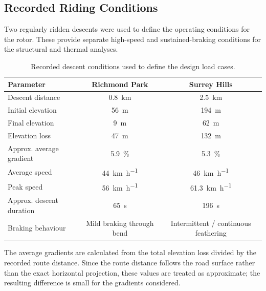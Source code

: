 \documentclass[11pt,a4paper]{article}
\begin{document}
\subsection{Recorded Riding Conditions}

Two regularly ridden descents were used to define the operating conditions for
the rotor. These provide separate high-speed and sustained-braking conditions
for the structural and thermal analyses.

\begin{table}[H]
    \centering
    \caption{Recorded descent conditions used to define the design load cases.}
    \label{tab:rides}
    \begin{tabularx}{\textwidth}{l c c}
        \toprule
        Parameter & Richmond Park & Surrey Hills \\
        \midrule

        Descent distance
        & \SI{0.8}{km}
        & \SI{2.5}{km} \\

        Initial elevation
        & \SI{56}{m}
        & \SI{194}{m} \\

        Final elevation
        & \SI{9}{m}
        & \SI{62}{m} \\

        Elevation loss
        & \SI{47}{m}
        & \SI{132}{m} \\

        Approx. average gradient
        & \SI{5.9}{\percent}
        & \SI{5.3}{\percent} \\

        Average speed
        & \SI{44}{km.h^{-1}}
        & \SI{46}{km.h^{-1}} \\

        Peak speed
        & \SI{56}{km.h^{-1}}
        & \SI{61.3}{km.h^{-1}} \\

        Approx. descent duration
        & \SI{65}{s}
        & \SI{196}{s} \\

        Braking behaviour
        & Mild braking through bend
        & Intermittent / continuous feathering \\

        \bottomrule
    \end{tabularx}
\end{table}

The average gradients are calculated from the total elevation loss divided by
the recorded route distance. Since the route distance follows the road surface
rather than the exact horizontal projection, these values are treated as
approximate; the resulting difference is small for the gradients considered.
\end{document}
